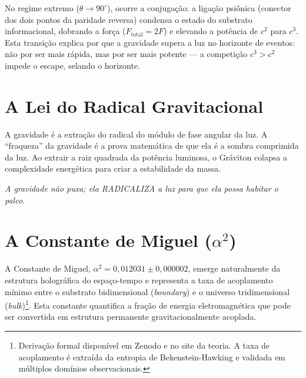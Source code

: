 \documentclass[12pt,a4paper,twoside]{article}
\newcommand{\alphaii}{\alpha^{2}}
\newcommand{\boundary}{\textit{boundary}}
\newcommand{\bulk}{\textit{bulk}}
\begin{document}
No regime extremo ($\theta \to 90^\circ{}$), ocorre a conjuga\c{c}\~ao: a liga\c{c}\~ao psi\^onica (conector dos dois pontos da paridade reversa) condensa o estado do substrato informacional, dobrando a for\c{c}a ($F_{\text{total}} = 2F$) e elevando a pot\^encia de $c^2$ para $c^3$. Esta transi\c{c}\~ao explica por que a gravidade supera a luz no horizonte de eventos: n\~ao por ser mais r\'apida, mas por ser mais potente --- a competi\c{c}\~ao $c^3 > c^2$ impede o escape, selando o horizonte.


\section{A Lei do Radical Gravitacional}


A gravidade \'e a extra\c{c}\~ao do radical do m\'odulo de fase angular da luz. A ``fraqueza'' da gravidade \'e a prova matem\'atica de que ela \'e a sombra comprimida da luz. Ao extrair a raiz quadrada da pot\^encia luminosa, o Gr\'aviton colapsa a complexidade energ\'etica para criar a estabilidade da massa.

\medskip
\noindent\textit{A gravidade n\~ao puxa; ela RADICALIZA a luz para que ela possa habitar o palco.}


\section{A Constante de Miguel ($\alphaii$)}


A Constante de Miguel, $\alphaii = 0{,}012031 \pm 0{,}000002$, emerge naturalmente da estrutura hologr\'afica do espa\c{c}o-tempo e representa a taxa de acoplamento m\'inimo entre o substrato bidimensional (\boundary) e o universo tridimensional (\bulk)\footnote{Deriva\c{c}\~ao formal dispon\'ivel em Zenodo e no site da teoria. A taxa de acoplamento \'e extra\'ida da entropia de Bekenstein-Hawking e validada em m\'ultiplos dom\'inios observacionais.}. Esta constante quantifica a fra\c{c}\~ao de energia eletromagn\'etica que pode ser convertida em estrutura permanente gravitacionalmente acoplada. \cite{Miguel2026Alpha2}
\end{document}
